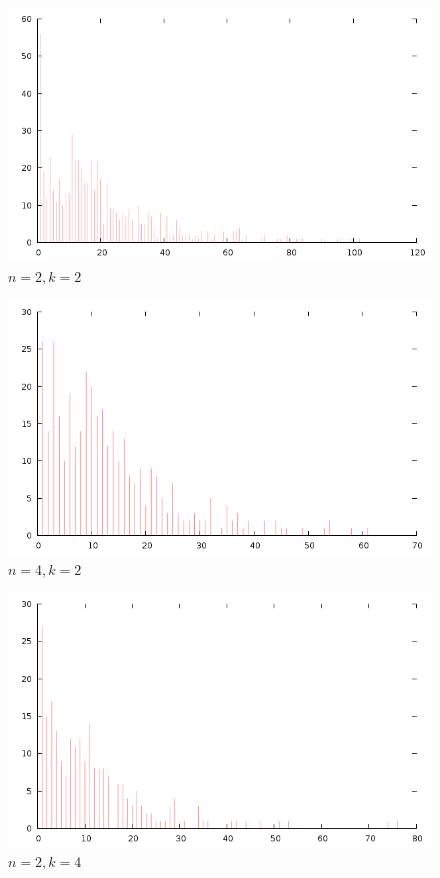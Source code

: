 \documentclass[12pt]{article}
\begin{document}
\begin{figure}[H]
\centering
\caption{$n=2,k=2$}
\includegraphics[scale=0.6]{changes-s0n2k2.png}
\end{figure} 

\begin{figure}[H]
\centering
\caption{$n=4,k=2$}
\includegraphics[scale=0.6]{changes-s0n4k2.png}
\end{figure} 

\begin{figure}[H]
\centering
\caption{$n=2,k=4$}
\includegraphics[scale=0.6]{changes-s0n2k4.png}
\end{figure} 
\end{document}
